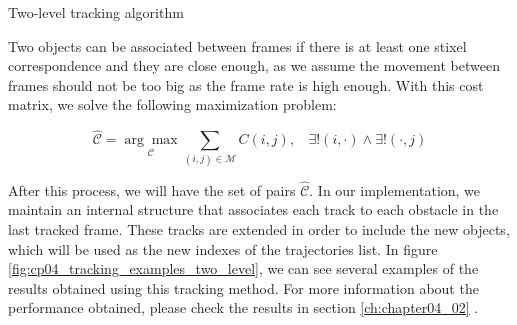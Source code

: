 \begin{algorithm}
\caption{Two-level tracking algorithm}
\label{alg:cp04_two_level_tracking}
\begin{algorithmic}
      \EndIf
    \EndFor
  \EndFor
\EndFunction
\end{algorithmic}
\end{algorithm}

Two objects can be associated between frames if there is at least one stixel correspondence and they are close enough, as we assume the movement between frames should not be too big as the frame rate is high enough. With this cost matrix, we solve the following maximization problem:

\begin{equation}\label{eq:cp04_two_level_maximization}
\mathcal{\hat{C}}=\underset{\mathcal{C}}{\arg\max} \underset{(i, j) \in \mathcal{M}}{\sum} C(i,j),
~~~~\exists! (i, \cdot) \wedge \exists! (\cdot, j)
\end{equation}

After this process, we will have the set of pairs $\mathcal{\hat{C}}$. In our implementation, we maintain an internal structure that associates each track to each obstacle in the last tracked frame. These tracks are extended in order to include the new objects, which will be used as the new indexes of the trajectories list. In figure \ref{fig:cp04_tracking_examples_two_level}, we can see several examples of the results obtained using this tracking method. For more information about the performance obtained, please check the results in section \ref{ch:chapter04_02} .

